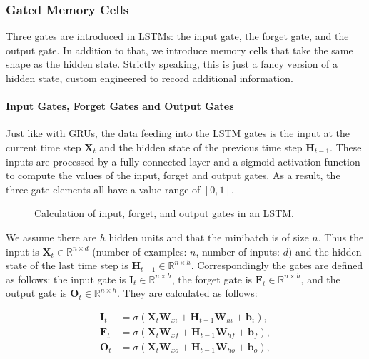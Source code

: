 \subsubsection{Gated Memory Cells}

Three gates are introduced in LSTMs: the input gate, the forget gate, and the output gate. In addition to that, we introduce memory cells that take the same shape as the hidden state. Strictly speaking, this is just a fancy version of a hidden state, custom engineered to record additional information.

\paragraph{Input Gates, Forget Gates and Output Gates}

Just like with GRUs, the data feeding into the LSTM gates is the input at the current time step $\mathbf{X}_t$ and the hidden state of the previous time step $\mathbf{H}_{t-1}$. These inputs are processed by a fully connected layer and a sigmoid activation function to compute the values of the input, forget and output gates. As a result, the three gate elements all have a value range of $[0,1]$.

\begin{figure}[hpt]
    \centering
    
    \caption{Calculation of input, forget, and output gates in an LSTM.}
    \label{fig:lstm_0}
\end{figure}

We assume there are $h$ hidden units and that the minibatch is of size $n$. Thus
the input is $\mathbf{X}_t \in \mathbb{R}^{n \times d}$ (number of examples:
$n$, number of inputs: $d$) and the hidden state of the last time step is $\mathbf{H}_{t-1} \in \mathbb{R}^{n \times h}$. Correspondingly the gates are defined as follows: the input gate is $\mathbf{I}_t \in \mathbb{R}^{n \times h}$, the forget gate is $\mathbf{F}_t \in \mathbb{R}^{n \times h}$, and the output gate is $\mathbf{O}_t \in \mathbb{R}^{n \times h}$. They are calculated as follows:

$$
\begin{aligned}
\mathbf{I}_t &= \sigma(\mathbf{X}_t \mathbf{W}_{xi} + \mathbf{H}_{t-1} \mathbf{W}_{hi} + \mathbf{b}_i),\\
\mathbf{F}_t &= \sigma(\mathbf{X}_t \mathbf{W}_{xf} + \mathbf{H}_{t-1} \mathbf{W}_{hf} + \mathbf{b}_f),\\
\mathbf{O}_t &= \sigma(\mathbf{X}_t \mathbf{W}_{xo} + \mathbf{H}_{t-1} \mathbf{W}_{ho} + \mathbf{b}_o),
\end{aligned}
$$

